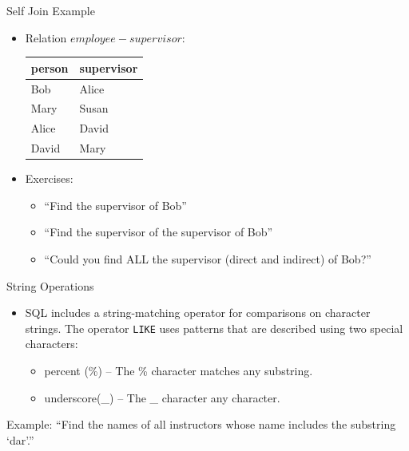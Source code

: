 \documentclass{beamer}
\begin{document}
\begin{frame}{Self Join Example}
    \begin{itemize}
        \item Relation $employee-supervisor$:
            \begin{tabular}{| l | l |}
                \hline
                \textbf{person} & \textbf{supervisor} \\
                \hline
                Bob & Alice \\ \hline
                Mary & Susan \\ \hline
                Alice & David \\ \hline
                David & Mary \\ \hline
            \end{tabular}
        \item Exercises:
        \begin{itemize}
            \item ``Find the supervisor of Bob''
            \item ``Find the supervisor of the supervisor of Bob''
            \item ``Could you find ALL the supervisor (direct and indirect) of Bob?''
        \end{itemize}
    \end{itemize}
\end{frame}

\begin{frame}[fragile]{String Operations}
    \begin{itemize}
        \item SQL includes a string-matching operator for comparisons on character strings.  The operator \texttt{LIKE} uses patterns that are described using two special characters:
        \begin{itemize}
            \item percent (\%) -- The \% character matches any substring.
            \item underscore(\_) -- The \_ character any character.
        \end{itemize}
    \end{itemize}
    \begin{exampleblock}{Example:}
        ``Find the names of all instructors whose name includes the substring `dar'.''
    \end{exampleblock}
\end{frame}
\end{document}
